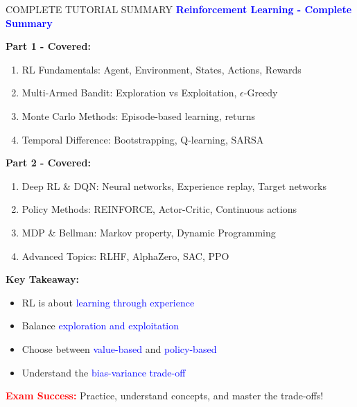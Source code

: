 \documentclass[8pt]{beamer}
\begin{document}
\begin{frame}{COMPLETE TUTORIAL SUMMARY}
\fontsize{6.5}{7.5}\selectfont
\textcolor{blue}{\textbf{Reinforcement Learning - Complete Summary}}

\textbf{Part 1 - Covered:}
\begin{enumerate}
\item RL Fundamentals: Agent, Environment, States, Actions, Rewards
\item Multi-Armed Bandit: Exploration vs Exploitation, $\epsilon$-Greedy
\item Monte Carlo Methods: Episode-based learning, returns
\item Temporal Difference: Bootstrapping, Q-learning, SARSA
\end{enumerate}

\textbf{Part 2 - Covered:}
\begin{enumerate}
\item Deep RL \& DQN: Neural networks, Experience replay, Target networks
\item Policy Methods: REINFORCE, Actor-Critic, Continuous actions
\item MDP \& Bellman: Markov property, Dynamic Programming
\item Advanced Topics: RLHF, AlphaZero, SAC, PPO
\end{enumerate}

\textbf{Key Takeaway:}
\begin{itemize}
\item RL is about \textcolor{blue}{learning through experience}
\item Balance \textcolor{blue}{exploration and exploitation}
\item Choose between \textcolor{blue}{value-based} and \textcolor{blue}{policy-based}
\item Understand the \textcolor{blue}{bias-variance trade-off}
\end{itemize}

\textcolor{red}{\textbf{Exam Success:}} Practice, understand concepts, and master the trade-offs!
\end{frame}
\end{document}

